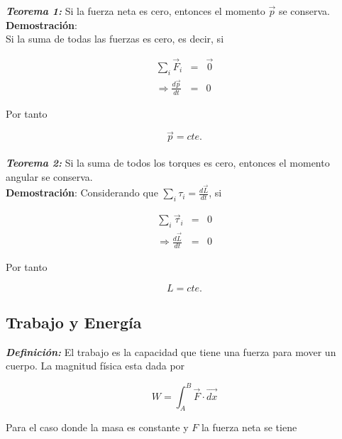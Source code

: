 \documentclass[12pt]{report}
\begin{document}
\textbf{\textit{Teorema 1:}} Si la fuerza neta es cero, entonces el momento $\displaystyle \vec{p}$ se conserva. \\

\textbf{Demostración}: \\

Si la suma de todas las fuerzas es cero, es decir, si

\begin{eqnarray} \nonumber
\sum_{i} \vec{F}_i &=& \vec{0} \\ \nonumber
\Rightarrow \frac{d\vec{p}}{dt}&=&0
\end{eqnarray} 

Por tanto

\begin{equation} \nonumber
\vec{p}=cte.
\end{equation}
\\


\textbf{\textit{Teorema 2:}} Si la suma de todos los torques es cero, entonces el momento angular se conserva. \\

\textbf{Demostración}: Considerando que $\displaystyle \sum_{i} \tau_i =\frac{d\vec{L}}{dt}$, si

\begin{eqnarray} \nonumber
\sum_{i} \vec{\tau}_i &=& 0 \\ \nonumber
\Rightarrow \frac{d\vec{L}}{dt} &=& 0
\end{eqnarray}

Por tanto

\begin{equation} \nonumber
L=cte.
\end{equation}







\subsection{Trabajo y Energía} 


\textbf{\textit{Definición:}} El trabajo es la capacidad que tiene una fuerza para mover un cuerpo. La magnitud física esta dada por

\begin{equation} \label{1.3}
W=\int_{A}^B \vec{F} \cdot \vec{dx}
\end{equation}

Para el caso donde la masa es constante y $F$ la fuerza neta se tiene
\end{document}
